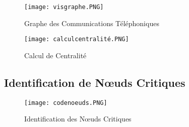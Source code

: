 \documentclass[12pt,a4paper]{article}
\begin{document}
\begin{figure}[H]
    \centering
    \texttt{[image: visgraphe.PNG]} %
    \caption{Graphe des Communications Téléphoniques}
    \label{fig:communications_telephoniques} %
\end{figure}

\begin{figure}[H]
    \centering
    \texttt{[image: calculcentralité.PNG]} %
    \caption{Calcul de Centralité}
    \label{fig:calcul_centralite} %
\end{figure}

\subsection*{Identification de Nœuds Critiques}

\begin{figure}[H]
    \centering
    \texttt{[image: codenoeuds.PNG]} %
    \caption{Identification des Nœuds Critiques}
    \label{fig:nodes_critics} %
\end{figure}
\end{document}
